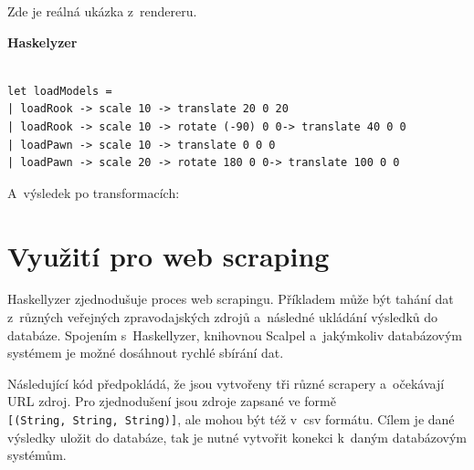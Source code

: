 \documentclass[male, czech]{kithesis}
\newcommand{\haskellInline}[1]{\colorbox{gray!10}{\texttt{#1}}}
\begin{document}
Zde je reálná ukázka z~rendereru.

\textbf{Haskelyzer}
\begin{verbatim}

let loadModels = 
| loadRook -> scale 10 -> translate 20 0 20
| loadRook -> scale 10 -> rotate (-90) 0 0-> translate 40 0 0
| loadPawn -> scale 10 -> translate 0 0 0
| loadPawn -> scale 20 -> rotate 180 0 0-> translate 100 0 0

\end{verbatim}

\newpage

A~výsledek po transformacích:

{\begin{center}
\end{center}
}

\section{Využití pro web scraping}

Haskellyzer zjednodušuje proces web scrapingu. 
Příkladem může být tahání dat z~různých veřejných zpravodajských zdrojů
a~následné ukládání výsledků do databáze. 
Spojením s~Haskellyzer, knihovnou Scalpel
a~jakýmkoliv databázovým systémem je možné dosáhnout rychlé sbírání dat.

Následující kód předpokládá, 
že jsou vytvořeny tři různé scrapery
a~očekávají URL zdroj.
Pro zjednodušení jsou zdroje zapsané ve formě \\ 
\haskellInline{[(String, String, String)]}, 
ale mohou být též v~csv formátu.
Cílem je dané výsledky uložit do databáze,
tak je nutné vytvořit konekci k~daným databázovým systémům. 
\end{document}
